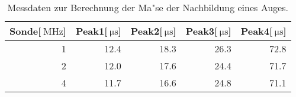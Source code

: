 \begin{table}[!h]
\begin{center}
\begin{tabular}{|r|r|r|r|r|}
\hline
Sonde[$\SI{}{\mega\hertz}$] & Peak1[$\SI{}{\micro\second}$] & Peak2[$\SI{}{\micro\second}$] & Peak3[$\SI{}{\micro\second}$] & Peak4[$\SI{}{\micro\second}$]\\
\hline
\hline
1 &	12.4 &	18.3 &	26.3 &	72.8\\
2 &	12.0 &	17.6 &	24.4 &	71.7\\
4 &	11.7 &	16.6 &	24.8 &	71.1\\
\hline
\end{tabular}
\caption[]{Messdaten zur Berechnung der Ma"se der Nachbildung eines Auges.}
\label{auge1}
\end{center}
\end{table}